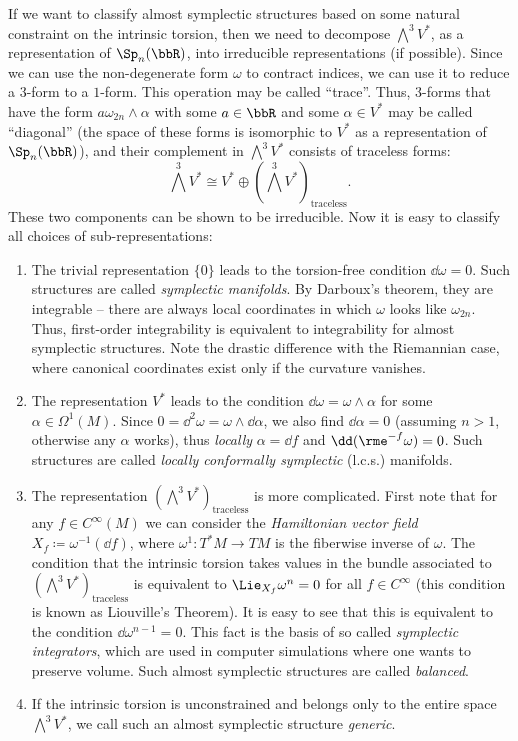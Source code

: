 \begin{example}
    If we want to classify almost symplectic structures based on some natural constraint on the intrinsic torsion, then we need to decompose $\bigwedge^3 V^\ast$, as a representation of $\Sp_{n}(\bbR)$, into irreducible representations (if possible). Since we can use the non-degenerate form $\omega$ to contract indices, we can use it to reduce a $3$-form to a $1$-form. This operation may be called ``trace''. Thus, $3$-forms that have the form $a\omega_{2n}\wedge\alpha$ with some $a\in\bbR$ and some $\alpha\in V^\ast$ may be called ``diagonal'' (the space of these forms is isomorphic to $V^\ast$ as a representation of $\Sp_n(\bbR)$), and their complement in $\bigwedge^3 V^\ast$ consists of traceless forms:
    \[\bigwedge^3 V^\ast \cong V^\ast\oplus \left(\bigwedge^3 V^\ast\right)_{\mathrm{traceless}}.\]
    These two components can be shown to be irreducible. Now it is easy to classify all choices of sub-representations:
    \begin{enumerate}
        \item The trivial representation $\{0\}$ leads to the torsion-free condition $\dd\omega=0$. Such structures are called \emph{symplectic manifolds}. By Darboux's theorem, they are integrable -- there are always local coordinates in which $\omega$ looks like $\omega_{2n}$. Thus, first-order integrability is equivalent to integrability for almost symplectic structures. Note the drastic difference with the Riemannian case, where canonical coordinates exist only if the curvature vanishes.
        \item The representation $V^\ast$ leads to the condition $\dd\omega=\omega\wedge \alpha$ for some $\alpha\in\Omega^1(M)$. Since $0=\dd^2\omega=\omega\wedge\dd\alpha$, we also find $\dd\alpha=0$ (assuming $n>1$, otherwise any $\alpha$ works), thus \emph{locally} $\alpha=\dd f$ and $\dd (\rme^{-f}\omega)=0$. Such structures are called \emph{locally conformally symplectic} (l.c.s.) manifolds.
        \item The representation $\left(\bigwedge^3 V^\ast\right)_{\mathrm{traceless}}$ is more complicated. First note that for any $f\in C^\infty(M)$ we can consider the \emph{Hamiltonian vector field} $X_f\coloneqq \omega^{-1}(\dd f)$, where $\omega^1:T^\ast M\to TM$ is the fiberwise inverse of $\omega$. The condition that the intrinsic torsion takes values in the bundle associated to $\left(\bigwedge^3 V^\ast\right)_{\mathrm{traceless}}$ is equivalent to $\Lie_{X_f}\omega^n=0$ for all $f\in C^\infty$ (this condition is known as Liouville's Theorem). It is easy to see that this is equivalent to the condition $\dd\omega^{n-1}=0$. This fact is the basis of so called \emph{symplectic integrators}, which are used in computer simulations where one wants to preserve volume. Such almost symplectic structures are called \emph{balanced}.
        \item If the intrinsic torsion is unconstrained and belongs only to the entire space $\bigwedge^3 V^\ast$, we call such an almost symplectic structure \emph{generic}.
    \end{enumerate}
\end{example}


